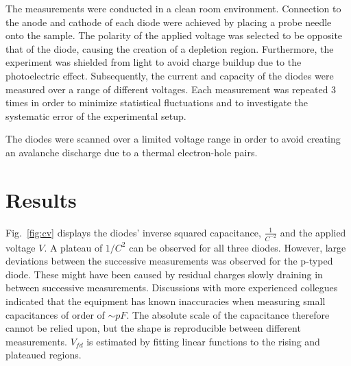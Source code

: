 \documentclass[11pt]{article}
\begin{document}
The measurements were conducted in a clean room environment. 
Connection to the anode and cathode of each diode were achieved by placing a probe needle onto the sample.
The polarity of the applied voltage was selected to be opposite that of the diode, causing the creation of a depletion region.
Furthermore, the experiment was shielded from light to avoid charge buildup due to the photoelectric effect. Subsequently, the current and capacity of the diodes were measured over a range of different voltages. Each measurement was repeated 3 times in order to minimize statistical fluctuations and to investigate the systematic error of the experimental setup.

The diodes were scanned over a limited voltage range in order to avoid creating an avalanche discharge due to a thermal electron-hole pairs.

\section{Results}
Fig.~\ref{fig:cv} displays the diodes' inverse squared capacitance, $\frac{1}{C^{-2}}$ and the applied voltage $V$.
A plateau of $1/C^2$ can be observed for all three diodes.
However, large deviations between the successive measurements was observed for the p-typed diode. These might have been caused by residual charges slowly draining in between successive measurements.
Discussions with more experienced collegues indicated that the equipment has known inaccuracies when measuring small capacitances of order of $\sim pF$. The absolute scale of the capacitance therefore cannot be relied upon, but the shape is reproducible between different measurements.
$V_{fd}$ is estimated by fitting linear functions to the rising and plateaued regions. 
\end{document}
